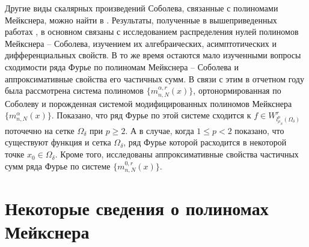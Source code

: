 Другие виды скалярных произведений Соболева, связанные с полиномами Мейкснера, можно найти в \cite{Ram-Mor-Bal,Ram-Co-So-Vil}.
Результаты, полученные в вышеприведенных работах \cite{Ram-Shar-VMJ,Ram-Ar-Go-Mar,Ram-Kh-Old,Ram-Bav1,Ram-Bav2,Ram-Shar-Sar,Ram-Mor-Bal,Ram-Co-So-Vil}, в основном связаны с исследованием распределения нулей полиномов Мейкснера --  Соболева, изучением их алгебраических, асимптотических и дифференциальных свойств. В то же время остаются мало изученными вопросы сходимости ряда Фурье по полиномам Мейкснера -- Соболева и аппроксимативные свойства его частичных сумм. В связи с этим в отчетном году была рассмотрена система полиномов $\{m_{n,N}^{\alpha,r}(x)\}$, ортонормированная по Соболеву и порожденная системой модифицированных полиномов Мейкснера $\{m_{n,N}^{\alpha}(x)\}$.
Показано, что ряд Фурье по этой системе сходится к $f\in W^r_{l^p_{\rho_N}(\Omega_\delta)}$ поточечно на сетке $\Omega_\delta$ при $p\ge2$. А в случае, когда $1\le p<2$ показано, что существуют функция и сетка $\Omega_\delta$, ряд Фурье которой расходится в некоторой точке $x_0\in\Omega_\delta$. Кроме того, исследованы аппроксимативные свойства частичных сумм ряда Фурье по системе $\{m_{n,N}^{0,r}(x)\}$.

\section{Некоторые сведения о полиномах Мейкснера}

